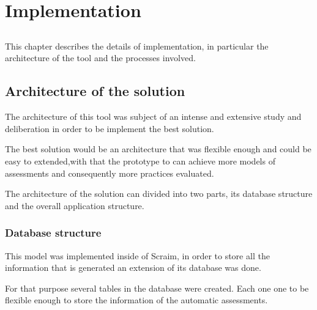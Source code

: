 \chapter{Implementation} \label{chap:implementation}

\section*{}

This chapter describes the details of implementation, in particular the architecture of the tool and the processes involved.

\section{Architecture of the solution} \label{sec:evaluation}
The architecture of this tool was subject of an intense and extensive study and deliberation in order to be implement the best solution.

The best solution would be an architecture that was flexible enough and could be easy to extended,with that the prototype to can achieve more models of assessments and consequently more practices evaluated.

The architecture of the solution can divided into two parts, its database structure and the overall application structure.

\subsection{Database structure}

This model was implemented inside of Scraim, in order to store all the information that is generated an extension of its database was done.

For that purpose several tables in the database were created. Each one one to be flexible enough to store the information of the automatic assessments.

